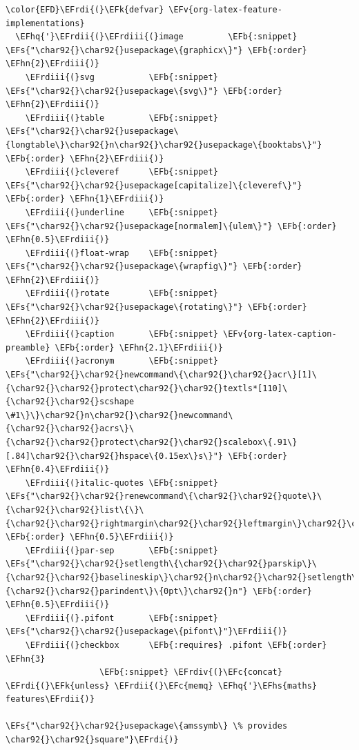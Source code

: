 \documentclass{scrartcl}
\newcommand{\EFk}[1]{\textcolor{EFk}{#1}} %
\newcommand{\EFs}[1]{\textcolor{EFs}{#1}} %
\newcommand{\EFb}[1]{\textcolor{EFb}{#1}} %
\newcommand{\EFc}[1]{\textcolor{EFc}{#1}} %
\newcommand{\EFv}[1]{\textcolor{EFv}{#1}} %
\newcommand{\EFhn}[1]{#1} %
\newcommand{\EFhq}[1]{#1} %
\newcommand{\EFhs}[1]{#1} %
\newcommand{\EFrdi}[1]{#1} %
\newcommand{\EFrdii}[1]{#1} %
\newcommand{\EFrdiii}[1]{#1} %
\newcommand{\EFrdiv}[1]{#1} %
\begin{document}
\begin{Code}
\begin{Verbatim}[]
\color{EFD}\EFrdi{(}\EFk{defvar} \EFv{org-latex-feature-implementations}
  \EFhq{'}\EFrdii{(}\EFrdiii{(}image         \EFb{:snippet} \EFs{"\char92{}\char92{}usepackage\{graphicx\}"} \EFb{:order} \EFhn{2}\EFrdiii{)}
    \EFrdiii{(}svg           \EFb{:snippet} \EFs{"\char92{}\char92{}usepackage\{svg\}"} \EFb{:order} \EFhn{2}\EFrdiii{)}
    \EFrdiii{(}table         \EFb{:snippet} \EFs{"\char92{}\char92{}usepackage\{longtable\}\char92{}n\char92{}\char92{}usepackage\{booktabs\}"} \EFb{:order} \EFhn{2}\EFrdiii{)}
    \EFrdiii{(}cleveref      \EFb{:snippet} \EFs{"\char92{}\char92{}usepackage[capitalize]\{cleveref\}"} \EFb{:order} \EFhn{1}\EFrdiii{)}
    \EFrdiii{(}underline     \EFb{:snippet} \EFs{"\char92{}\char92{}usepackage[normalem]\{ulem\}"} \EFb{:order} \EFhn{0.5}\EFrdiii{)}
    \EFrdiii{(}float-wrap    \EFb{:snippet} \EFs{"\char92{}\char92{}usepackage\{wrapfig\}"} \EFb{:order} \EFhn{2}\EFrdiii{)}
    \EFrdiii{(}rotate        \EFb{:snippet} \EFs{"\char92{}\char92{}usepackage\{rotating\}"} \EFb{:order} \EFhn{2}\EFrdiii{)}
    \EFrdiii{(}caption       \EFb{:snippet} \EFv{org-latex-caption-preamble} \EFb{:order} \EFhn{2.1}\EFrdiii{)}
    \EFrdiii{(}acronym       \EFb{:snippet} \EFs{"\char92{}\char92{}newcommand\{\char92{}\char92{}acr\}[1]\{\char92{}\char92{}protect\char92{}\char92{}textls*[110]\{\char92{}\char92{}scshape \#1\}\}\char92{}n\char92{}\char92{}newcommand\{\char92{}\char92{}acrs\}\{\char92{}\char92{}protect\char92{}\char92{}scalebox\{.91\}[.84]\char92{}\char92{}hspace\{0.15ex\}s\}"} \EFb{:order} \EFhn{0.4}\EFrdiii{)}
    \EFrdiii{(}italic-quotes \EFb{:snippet} \EFs{"\char92{}\char92{}renewcommand\{\char92{}\char92{}quote\}\{\char92{}\char92{}list\{\}\{\char92{}\char92{}rightmargin\char92{}\char92{}leftmargin\}\char92{}\char92{}item\char92{}\char92{}relax\char92{}\char92{}em\}\char92{}n"} \EFb{:order} \EFhn{0.5}\EFrdiii{)}
    \EFrdiii{(}par-sep       \EFb{:snippet} \EFs{"\char92{}\char92{}setlength\{\char92{}\char92{}parskip\}\{\char92{}\char92{}baselineskip\}\char92{}n\char92{}\char92{}setlength\{\char92{}\char92{}parindent\}\{0pt\}\char92{}n"} \EFb{:order} \EFhn{0.5}\EFrdiii{)}
    \EFrdiii{(}.pifont       \EFb{:snippet} \EFs{"\char92{}\char92{}usepackage\{pifont\}"}\EFrdiii{)}
    \EFrdiii{(}checkbox      \EFb{:requires} .pifont \EFb{:order} \EFhn{3}
                   \EFb{:snippet} \EFrdiv{(}\EFc{concat} \EFrdi{(}\EFk{unless} \EFrdii{(}\EFc{memq} \EFhq{'}\EFhs{maths} features\EFrdii{)}
                                      \EFs{"\char92{}\char92{}usepackage\{amssymb\} \% provides \char92{}\char92{}square"}\EFrdi{)}

\end{Verbatim}
\end{Code}
\end{document}
